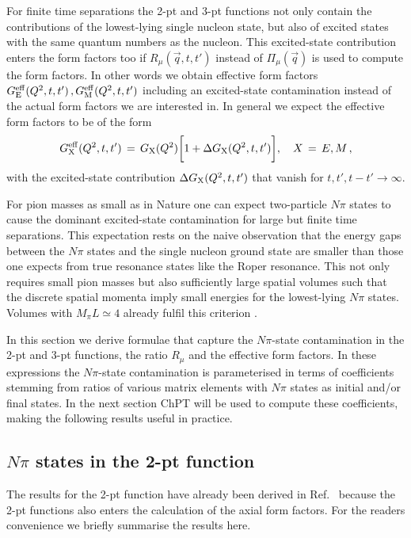\documentclass[11pt,prd,aps,showpacs,eqsecnum,floatfix,nofootinbib,preprint,tightenlines]{revtex4}
\newcommand{\np}{N\pi}
\begin{document}
For finite time separations the 2-pt and 3-pt functions not only contain the contributions of the lowest-lying single nucleon state, but also of excited states with the same quantum numbers as the nucleon. This excited-state contribution enters the form factors too if $R_{\mu}(\vec{q},t,t')$  instead of $ \Pi_{\mu}(\vec{q})$ is used to compute the form factors. In other words we obtain {\rm effective} form factors $G^{\rm eff}_{\rm E}(Q^2,t,t')\,, {G}^{\rm eff}_{\rm M}(Q^2,t,t')$ including an excited-state contamination instead of the actual form factors we are interested in. In general we expect the effective form factors to be of the form 
\begin{eqnarray}
G^{\rm eff}_{\rm X}(Q^2,t,t')\, = \,G_{\rm X}(Q^2)\bigg[ 1 + \Delta G_{\rm X}(Q^2,t,t')\bigg],\quad X\,=\,E,M\,,\label{EffGX}
\end{eqnarray}
with the excited-state contribution $\Delta G_{\rm X}(Q^2,t,t')$ that vanish for $t,t',t-t'\rightarrow \infty$. 

For pion masses as small as in Nature one can expect two-particle $N\pi$ states to cause the dominant excited-state contamination for large but finite time separations. This expectation rests on the naive observation that the energy gaps between the $N\pi$ states and the single nucleon ground state are smaller than those one expects from true resonance states like the Roper resonance. This not only requires small pion masses but also sufficiently large spatial volumes such that the discrete spatial momenta imply small energies for the lowest-lying $N\pi$ states. Volumes with $M_{\pi}L\simeq 4$ already fulfil this criterion \cite{Bar:2017kxh}.

In this section we derive formulae that capture the $N\pi$-state contamination in the 2-pt and 3-pt functions, the ratio $R_{\mu}$ and the effective form factors. In these expressions the $N\pi$-state contamination is parameterised in terms of coefficients stemming from ratios of various matrix elements with $N\pi$ states as initial and/or final states. In the next section ChPT will be used to compute these coefficients, making the following results useful in practice. 

\subsection{$\np$ states in the 2-pt function}
The results for the 2-pt function have already been derived in Ref.\ \cite{Bar:2016uoj} because the 2-pt functions also enters the calculation of the axial form factors. For the readers convenience we briefly summarise the results here.
\end{document}
